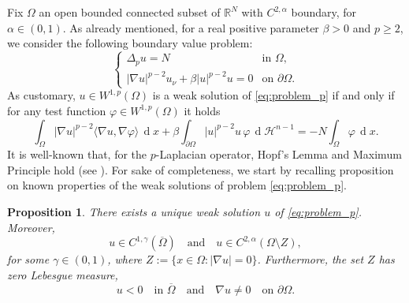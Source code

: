 \documentclass[10pt,a4paper, reqno]{amsart}
\numberwithin{equation}{section}
\newcommand{\R}{\mathbb{R}}
\newtheorem{prop}[teo]{Proposition}
\renewcommand{\d}[1]{\ensuremath{\operatorname{d}\!{#1}}}
\begin{document}
Fix $\Omega$ an open bounded connected subset of $\R^N$ with $C^{2,\alpha}$ boundary, for $\alpha \in (0,1)$. As already mentioned, for a real positive parameter $\beta > 0$ and $p\geq2$, we consider the following boundary value problem:
\begin{equation} \label{eq:problem_p}
    \begin{cases}
    \Delta_p u = N & \text{in } \Omega, \\
    |\nabla u|^{p-2} u_\nu + \beta |u|^{p-2}u = 0 & \text{on } \partial\Omega.
    \end{cases}
\end{equation}
As customary, $u\in W^{1,p}(\Omega)$ is a weak solution of \eqref{eq:problem_p} if and only if for any test function $\varphi \in  W^{1,p}(\Omega)$ it holds
\begin{equation*}
    \int_\Omega |\nabla u|^{p-2} \langle \nabla u, \nabla \varphi \rangle \,\d{x} +\beta \int_{\partial\Omega}|u|^{p-2}u\,\varphi\,\d{\mathcal H^{n-1}}
    =-N\int_\Omega \varphi \,\d{x}.
\end{equation*}
It is well-known that, for the $p$-Laplacian operator, Hopf's Lemma and Maximum Principle hold (see \cite[Chapter 5]{PucciSerrin07}). For sake of completeness, we start by recalling  proposition on known properties of the weak solutions of problem \ref{eq:problem_p}. 

\begin{prop}\label{prop properties u}
There exists a unique weak solution $u$ of \eqref{eq:problem_p}. Moreover,
\begin{equation*}
    u \in C^{1,\gamma}(\overline{\Omega}) \quad \text{and} \quad u \in C^{2,\alpha}(\Omega \setminus Z),
\end{equation*}
for some $\gamma \in (0,1)$, where $Z := \{x \in \Omega \colon |\nabla u| = 0\}$.
Furthermore, the set $Z$ has zero Lebesgue measure,
\[
u<0 \quad \text{in } \overline{\Omega} \quad \text{and} \quad
\nabla u \neq 0 \quad \text{on } \partial\Omega.
\]
\end{prop}
\end{document}
